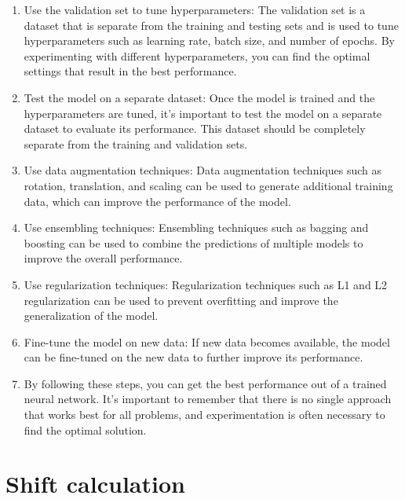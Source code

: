         \begin{enumerate}
            \item Use the validation set to tune hyperparameters: The validation set is a dataset that is separate from the training and testing
            sets and is used to tune hyperparameters such as learning rate, batch size, and number of epochs. By experimenting with different
            hyperparameters, you can find the optimal settings that result in the best performance.
            \item Test the model on a separate dataset: Once the model is trained and the hyperparameters are tuned, it's important to
            test the model on a separate dataset to evaluate its performance. This dataset should be completely separate from the training and validation sets.
            \item Use data augmentation techniques: Data augmentation techniques such as rotation, translation, and scaling can be used to generate
            additional training data, which can improve the performance of the model.
            \item Use ensembling techniques: Ensembling techniques such as bagging and boosting can be used to combine the predictions of multiple
            models to improve the overall performance.
            \item Use regularization techniques: Regularization techniques such as L1 and L2 regularization can be used to prevent
            overfitting and improve the generalization of the model.
            \item Fine-tune the model on new data: If new data becomes available, the model can be fine-tuned on the
            new data to further improve its performance.
            \item By following these steps, you can get the best performance out of a trained neural network.
            It's important to remember that there is no single approach that works best for all problems, and experimentation is often
            necessary to find the optimal solution.
        \end{enumerate}
    \section{Shift calculation} \label{sec:shiftcalc}
